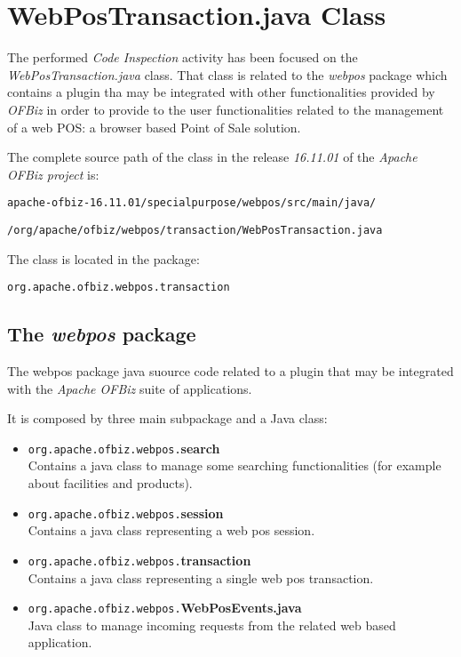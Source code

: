 \section{WebPosTransaction.java Class}
The performed \emph{Code Inspection} activity has been focused on the \emph{WebPosTransaction.java} class. That class is related to the \textit{webpos} package which contains a plugin tha may be integrated with other functionalities provided by \textit{OFBiz} in order to provide to the user functionalities related to the management of a web POS: a browser based Point of Sale solution.

The complete source path of the class in the release \emph{16.11.01} of the \emph{Apache OFBiz project} is:\\

\centerline{\tt apache-ofbiz-16.11.01/specialpurpose/webpos/src/main/java/}
\centerline{\tt /org/apache/ofbiz/webpos/transaction/WebPosTransaction.java} \hfill

The class is located in the package:\\
\centerline{\tt org.apache.ofbiz.webpos.transaction}

\subsection{The \textit{webpos} package}
The webpos package java suource code related to a plugin that may be integrated with the \emph{Apache OFBiz} suite of applications.

It is composed by three main subpackage and a Java class:
\begin{itemize}
	\item \texttt{org.apache.ofbiz.webpos.}\textbf{search}\\Contains a java class to manage some searching functionalities (for example about facilities and products).
	\item \texttt{org.apache.ofbiz.webpos.}\textbf{session}\\Contains a java class representing a web pos session.
	\item \texttt{org.apache.ofbiz.webpos.}\textbf{transaction} \\Contains a java class representing  a single web pos transaction.
	\item \texttt{org.apache.ofbiz.webpos.}\textbf{WebPosEvents.java} \\Java class to manage incoming requests from the related web based application.
\end{itemize}

